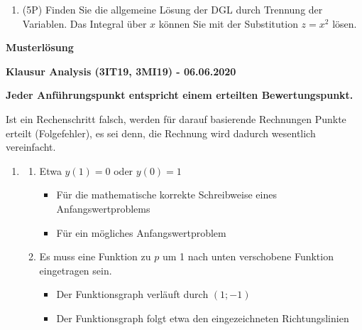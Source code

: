\documentclass[12pt]{article}
\begin{document}
{\begin{enumerate}[label=(\alph*)]
\bigskip
\bigskip
\bigskip
\bigskip
\bigskip
\bigskip
\bigskip
\bigskip
\bigskip
\bigskip
\bigskip
\bigskip
\bigskip
\bigskip
\bigskip
\bigskip

\item (5P) Finden Sie die allgemeine Lösung der DGL durch Trennung der Variablen. Das Integral über $x$ können Sie mit der Substitution $z=x^2$ lösen.


\end{enumerate}

\label{LastTask}

\newpage

\begin{center}
{\bf {\large Musterlösung}}
\end{center}

\begin{center}
{\bf {\large Klausur Analysis (3IT19, 3MI19) - 06.06.2020}}
\end{center}

\begin{center}
\textbf{Jeder Anführungspunkt entspricht einem erteilten Bewertungspunkt.} 

Ist ein Rechenschritt falsch, werden für darauf basierende Rechnungen Punkte erteilt (Folgefehler), es sei denn, die Rechnung wird dadurch wesentlich vereinfacht. 
\end{center}

\begin{enumerate}

\item
\begin{enumerate}

\item Etwa $y(1) = 0$ oder $y(0) = 1$	
\begin{itemize}
\item Für die mathematische korrekte Schreibweise eines Anfangswertproblems
\item Für ein mögliches Anfangswertproblem
\end{itemize}

\item Es muss eine Funktion zu $p$ um 1 nach unten verschobene Funktion eingetragen sein.
\begin{itemize}
\item Der Funktionsgraph verläuft durch $(1;-1)$
\item Der Funktionsgraph folgt etwa den eingezeichneten Richtungslinien
\end{itemize}


\end{enumerate}
\end{enumerate}}
\end{document}
